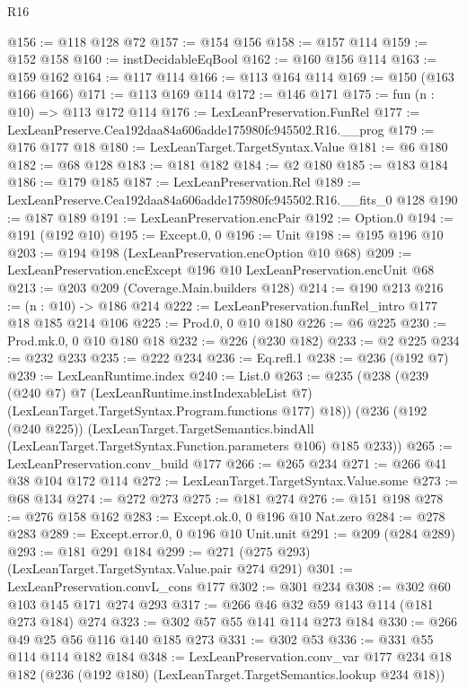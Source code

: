 \begin{lexlean}{R16}
\begin{coremodule}
@156 := @118 @128 @72
@157 := @154 @156
@158 := @157 @114
@159 := @152 @158
@160 := instDecidableEqBool
@162 := @160 @156 @114
@163 := @159 @162
@164 := @117 @114
@166 := @113 @164 @114
@169 := @150 (@163 @166 @166)
@171 := @113 @169 @114
@172 := @146 @171
@175 := fun (n : @10) => @113 @172 @114
@176 := LexLeanPreservation.FunRel
@177 := LexLeanPreserve.Cea192daa84a606adde175980fc945502.R16.__prog
@179 := @176 @177 @18
@180 := LexLeanTarget.TargetSyntax.Value
@181 := @6 @180
@182 := @68 @128
@183 := @181 @182
@184 := @2 @180
@185 := @183 @184
@186 := @179 @185
@187 := LexLeanPreservation.Rel
@189 := LexLeanPreserve.Cea192daa84a606adde175980fc945502.R16.__fits_0 @128
@190 := @187 @189
@191 := LexLeanPreservation.encPair
@192 := Option.{0}
@194 := @191 (@192 @10)
@195 := Except.{0, 0}
@196 := Unit
@198 := @195 @196 @10
@203 := @194 @198 (LexLeanPreservation.encOption @10 @68)
@209 := LexLeanPreservation.encExcept @196 @10 LexLeanPreservation.encUnit @68
@213 := @203 @209 (Coverage.Main.builders @128)
@214 := @190 @213
@216 := (n : @10) -> @186 @214
@222 := LexLeanPreservation.funRel_intro @177 @18 @185 @214 @106
@225 := Prod.{0, 0} @10 @180
@226 := @6 @225
@230 := Prod.mk.{0, 0} @10 @180 @18
@232 := @226 (@230 @182)
@233 := @2 @225
@234 := @232 @233
@235 := @222 @234
@236 := Eq.refl.{1}
@238 := @236 (@192 @7)
@239 := LexLeanRuntime.index
@240 := List.{0}
@263 := @235
    (@238
      (@239
        (@240 @7)
        @7
        (LexLeanRuntime.instIndexableList @7)
        (LexLeanTarget.TargetSyntax.Program.functions @177)
        @18))
    (@236
      (@192 (@240 @225))
      (LexLeanTarget.TargetSemantics.bindAll
        (LexLeanTarget.TargetSyntax.Function.parameters @106)
        @185
        @233))
@265 := LexLeanPreservation.conv_build @177
@266 := @265 @234
@271 := @266 @41 @38 @104 @172 @114
@272 := LexLeanTarget.TargetSyntax.Value.some
@273 := @68 @134
@274 := @272 @273
@275 := @181 @274
@276 := @151 @198
@278 := @276 @158 @162
@283 := Except.ok.{0, 0} @196 @10 Nat.zero
@284 := @278 @283
@289 := Except.error.{0, 0} @196 @10 Unit.unit
@291 := @209 (@284 @289)
@293 := @181 @291 @184
@299 := @271 (@275 @293) (LexLeanTarget.TargetSyntax.Value.pair @274 @291)
@301 := LexLeanPreservation.convL_cons @177
@302 := @301 @234
@308 := @302 @60 @103 @145 @171 @274 @293
@317 := @266 @46 @32 @59 @143 @114 (@181 @273 @184) @274
@323 := @302 @57 @55 @141 @114 @273 @184
@330 := @266 @49 @25 @56 @116 @140 @185 @273
@331 := @302 @53
@336 := @331 @55 @114 @114 @182 @184
@348 := LexLeanPreservation.conv_var
    @177
    @234
    @18
    @182
    (@236 (@192 @180) (LexLeanTarget.TargetSemantics.lookup @234 @18))

\end{coremodule}
\end{lexlean}
